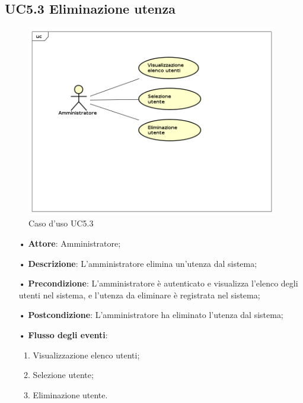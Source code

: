 \subsection{UC5.3 Eliminazione utenza}


\begin{figure}[H]
\centering
\includegraphics[width=11cm]{img/UC53.png} 
\caption{Caso d'uso UC5.3}
\end{figure}


\begin{itemize}
\item[•] \textbf{Attore}: Amministratore;

\item[•] \textbf{Descrizione}: L’amministratore elimina un’utenza dal sistema;

\item[•] \textbf{Precondizione}: L’amministratore \`{e} autenticato e visualizza l’elenco degli utenti nel sistema, e l’utenza da eliminare \`{e} registrata nel sistema;

\item[•] \textbf{Postcondizione}: L’amministratore ha eliminato l’utenza dal sistema; 

\item[•] \textbf{Flusso degli eventi}:

\begin{enumerate}

\item Visualizzazione elenco utenti;

\item Selezione utente;

\item Eliminazione utente.

\end{enumerate}

\end{itemize}
